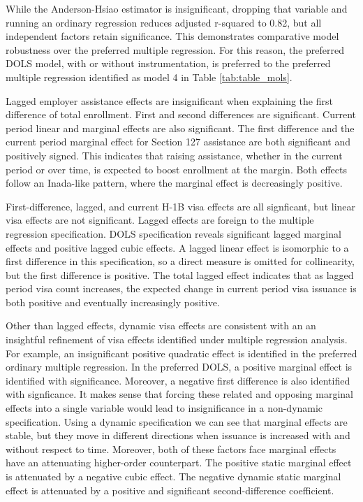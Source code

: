\documentclass[review]{elsarticle}
\begin{document}
    While the Anderson-Hsiao estimator is insignificant,
    dropping that variable and running an ordinary regression reduces adjusted r-squared to 0.82,
    but all independent factors retain significance.
    This demonstrates comparative model robustness over the preferred multiple regression.
    For this reason, the preferred DOLS model, with or without instrumentation,
    is preferred to the preferred multiple regression identified as
    model 4 in Table \ref{tab:table_mols}.

    Lagged employer assistance effects are insignificant when explaining the first difference of total enrollment.
    First and second differences are significant.
    Current period linear and marginal effects are also significant.
    The first difference and the current period marginal effect for
    Section 127 assistance are both significant and positively signed.
    This indicates that raising assistance,
    whether in the current period or over time,
    is expected to boost enrollment at the margin.
    Both effects follow an Inada-like pattern, where the marginal effect is decreasingly positive.

    First-difference, lagged, and current H-1B visa effects are all signficant,
    but linear visa effects are not significant.
    Lagged effects are foreign to the multiple regression specification.
    DOLS specification reveals significant lagged marginal effects and positive
    lagged cubic effects.
    A lagged linear effect is isomorphic to a first difference in this specification,
    so a direct measure is omitted for collinearity,
    but the first difference is positive.
    The total lagged effect indicates that as lagged period visa count increases,
    the expected change in current period visa issuance is both positive and eventually increasingly positive.

    Other than lagged effects, dynamic visa effects are consistent with an an insightful refinement of
    visa effects identified under multiple regression analysis.
    For example, an insignificant positive quadratic effect is identified in the preferred ordinary multiple regression.
    In the preferred DOLS, a positive marginal effect is identified with significance.
    Moreover, a negative first difference is also identified with signficance.
    It makes sense that forcing these related and opposing marginal effects into a single variable would lead
    to insignificance in a non-dynamic specification.
    Using a dynamic specification we can see that marginal effects are stable,
    but they move in different directions when issuance is increased with and without respect to time.
    Moreover, both of these factors face marginal effects have an attenuating higher-order counterpart.
    The positive static marginal effect is attenuated by a negative cubic effect.
    The negative dynamic static marginal effect is attenuated by a positive and significant second-difference coefficient.
\end{document}

